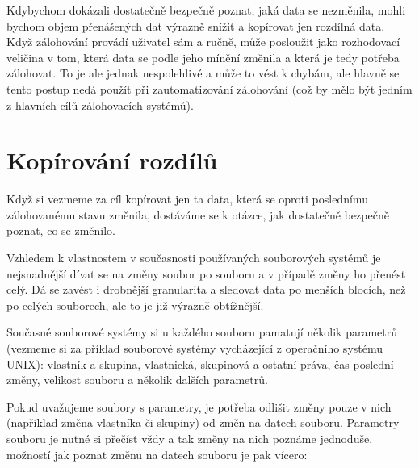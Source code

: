 Kdybychom dokázali dostatečně bezpečně poznat, jaká data se nezměnila, mohli
bychom objem přenášených dat výrazně snížit a kopírovat jen rozdílná data.
Když zálohování provádí uživatel sám a ručně, může posloužit jako rozhodovací
veličina v tom, která data se podle jeho mínění změnila a která je tedy potřeba
zálohovat. To je ale jednak nespolehlivé a může to vést k chybám, ale hlavně se
tento postup nedá použít při zautomatizování zálohování (což by mělo být jedním
z hlavních cílů zálohovacích systémů).

\newpage

\section{Kopírování rozdílů}

Když si vezmeme za cíl kopírovat jen ta data, která se oproti poslednímu
zálohovanému stavu změnila, dostáváme se k otázce, jak dostatečně bezpečně
poznat, co se změnilo.

Vzhledem k vlastnostem v současnosti používaných souborových systémů je
nejsnadnější dívat se na změny soubor po souboru a v případě změny ho přenést
celý. Dá se zavést i drobnější granularita a sledovat data po menších blocích,
než po celých souborech, ale to je již výrazně obtížnější.


Současné souborové systémy si u každého souboru pamatují několik parametrů
(vezmeme si za příklad souborové systémy vycházející z operačního systému
\gls{UNIX}): vlastník a skupina, vlastnická, skupinová a ostatní práva, čas
poslední změny, velikost souboru a několik dalších parametrů.

Pokud uvažujeme soubory s parametry, je potřeba odlišit změny pouze v nich
(například změna vlastníka či skupiny) od změn na datech souboru. Parametry
souboru je nutné si přečíst vždy a tak změny na nich poznáme jednoduše, možností
jak poznat změnu na datech souboru je pak vícero:



